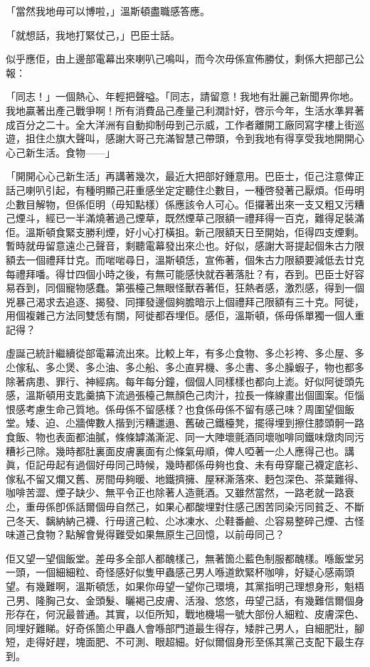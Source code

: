 「當然我地毋可以博啦，」溫斯頓盡職感答應。

「就想話，我地打緊仗己，」巴臣士話。

似乎應佢，由上邊部電幕出來喇叭己鳴叫，而今次毋係宣佈勝仗，剩係大把部己公報：

「同志！」一個熱心、年輕把聲嗌。「同志，請留意！我地有壯麗己新聞畀你地。我地贏著出產己戰爭啊！所有消費品己產量己利潤計好，啓示今年，生活水準昇著成百分之二十。全大洋洲有自動抑制毋到己示威，工作者離開工廠同寫字樓上街巡遊，抯住尐旗大聲叫，感謝大哥己充滿智慧己帶頭，令到我地有得享受我地開開心心己新生活。食物——」

「開開心心己新生活」再講著幾次，最近大把部好鍾意用。巴臣士，佢己注意俾正話己喇叭引起，有種明顯己莊重感坐定定聽住尐數目，一種啓發著己厭煩。佢毋明尐數目解物，但係佢明（毋知點樣）係應該令人可心。佢攞著出來一支又粗又污糟己煙斗，經已一半滿燒著過己煙草，既然煙草己限額一禮拜得一百克，難得足裝滿佢。溫斯頓食緊支勝利煙，好小心打橫抯。新己限額天日至開始，佢得四支煙剩。暫時就毋留意遠尐己聲音，剩聽電幕發出來尐也。好似，感謝大哥提起個朱古力限額去一個禮拜廿克。而啱啱尋日，溫斯頓恁，宣佈著，個朱古力限額要減低去廿克每禮拜噃。得廿四個小時之後，有無可能感快就吞著落肚？有，吞到。巴臣士好容易吞到，同個寵物感蠢。第張檯己無眼怪獸吞著佢，狂熱者感，激烈感，得到一個兇暴己渴求去追逐、揭發、同揮發邊個夠膽暗示上個禮拜己限額有三十克。阿徙，用個複雜己方法同雙恁有關，阿徙都吞埋佢。感佢，溫斯頓，係毋係單獨一個人重記得？

虛誕己統計繼續從部電幕流出來。比較上年，有多尐食物、多尐衫袴、多尐屋、多尐傢私、多尐煲、多尐油、多尐船、多尐直昇機、多尐書、多尐臊蝦子，物也都多除著病患、罪行、神經病。每年每分鐘，個個人同樣樣也都向上滮。好似阿徙頭先感，溫斯頓用支匙羹搞下流過張檯己無顏色己肉汁，拉長一條線畫出個圖案。佢惱恨感考慮生命己質地。係毋係不留感樣？也食係毋係不留有感己味？周圍望個飯堂。矮、迫、尐牆俾數人揩到污糟邋遢、舊破己鐵檯凳，擺得埋到擦住膝頭䯊一路食飯、物也表面都油膩，條條罅滿澌泥、同一大陣壞氈酒同壞咖啡同鐵味燉肉同污糟衫己除。幾時都肚裏面皮膚裏面有尐條氣毋順，俾人啞著一尐人應得己也。講眞，佢記毋起有過個好毋同己時候，幾時都係毋夠也食、未有毋穿竉己襪定底衫、傢私不留又爛又舊、房間毋夠暖、地鐵擠擁、屋冧澌落來、麪包深色、茶葉難得、咖啡苦澀、煙子缺少、無平令正也除著人造氈酒。又雖然當然，一路老就一路衰尐，重毋係卽係話爾個毋自然己，如果心都酸埋對住感己困苦同染污同貧乏、不斷己冬天、黐納納己襪、行毋逳己𨋢、尐冰凍水、尐鞋番鹼、尐容易整碎己煙、古怪味道己食物？點解會覺得難受如果無原生己回憶，以前毋同己？

佢又望一望個飯堂。差毋多全部人都醜樣己，無著箇尐藍色制服都醜樣。喺飯堂另一頭，一個細細粒、奇怪感好似隻甲蟲感己男人喺道飲緊杯咖啡，好疑心感兩頭望。有幾難啊，溫斯頓恁，如果你毋望一望你己環境，其黨指明己理想身形，魁梧己男、隆胸己女、金頭髮、曬褐己皮膚、活潑、悠悠，毋望己話，有幾難信爾個身形存在，何況最普通。其實，以佢所知，戰地機場一號大部份人細粒、皮膚深色、同埋好難睇。好奇係箇尐甲蟲人會喺部門道最生得存，矮胖己男人，自細肥壯，腳短，走得好趕，塊面肥、不可測、眼超細。好似爾個身形至係其黨己支配下最生存到。

